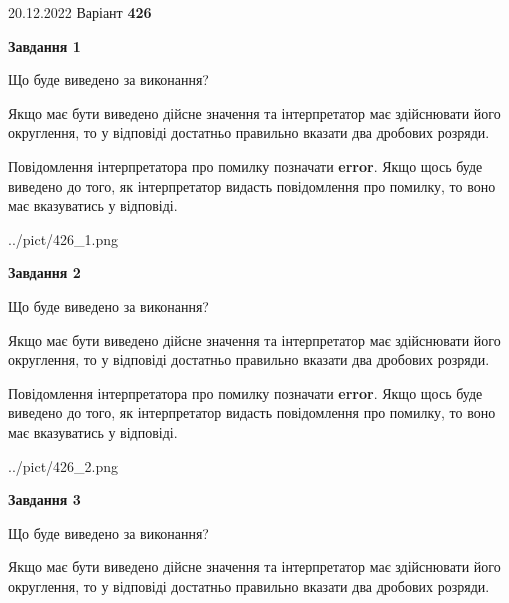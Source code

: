 \documentclass[12pt, ukrainian]{article}
\begin{document}
{20.12.2022 Варіант \No \textbf { 426 }\par}
{
\begin {Large}

{\begin {center}\textbf{Завдання 1}\end {center}}\par
Що буде виведено за виконання? \par

Якщо має бути виведено дійсне значення та інтерпретатор має здійснювати його округлення, 
то у відповіді достатньо правильно вказати два дробових розряди.

Повідомлення інтерпретатора про помилку позначати \textbf{error}.
Якщо щось буде виведено до того, як інтерпретатор видасть повідомлення про помилку, 
то воно має вказуватись у відповіді. \par

\begin{center}
	{../pict/426_1.png}
\end{center}
\newpage

{\begin {center}\textbf{Завдання 2}\end {center}}\par
Що буде виведено за виконання? \par

Якщо має бути виведено дійсне значення та інтерпретатор має здійснювати його округлення, 
то у відповіді достатньо правильно вказати два дробових розряди.

Повідомлення інтерпретатора про помилку позначати \textbf{error}.
Якщо щось буде виведено до того, як інтерпретатор видасть повідомлення про помилку, 
то воно має вказуватись у відповіді. \par

\begin{center}
	{../pict/426_2.png}
\end{center}
\newpage

{\begin {center}\textbf{Завдання 3}\end {center}}\par
Що буде виведено за виконання? \par

Якщо має бути виведено дійсне значення та інтерпретатор має здійснювати його округлення, 
то у відповіді достатньо правильно вказати два дробових розряди.


\end{Large}}
\end{document}
